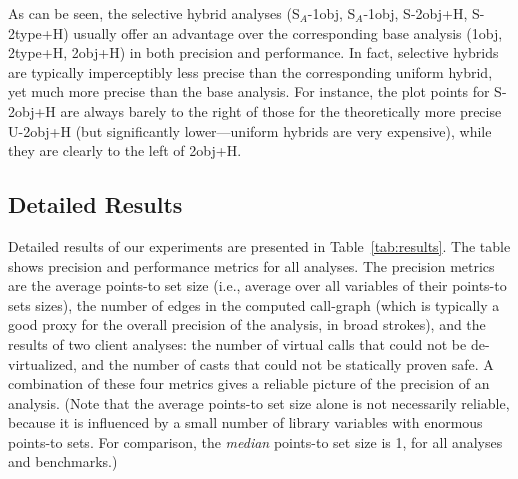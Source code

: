 As can be seen, the selective hybrid analyses (S$_A$-1obj, S$_A$-1obj,
S-2obj+H, S-2type+H) usually offer an advantage over the
corresponding base analysis (1obj, 2type+H, 2obj+H) in both precision
and performance. In fact, selective hybrids are typically
imperceptibly less precise than the corresponding uniform hybrid, yet
much more precise than the base analysis. For instance, the plot
points for S-2obj+H are always barely to the right of those for the
theoretically more precise U-2obj+H (but significantly lower---uniform
hybrids are very expensive), while they are clearly to the left of
2obj+H.


\subsection{Detailed Results}

Detailed results of our experiments are presented in
Table~\ref{tab:results}.  The table shows precision and performance
metrics for all analyses. The precision metrics are the average
points-to set size (i.e., average over all variables of their
points-to sets sizes), the number of edges in the computed call-graph
(which is typically a good proxy for the overall precision of the
analysis, in broad strokes), and the results of two client analyses:
the number of virtual calls that could not be de-virtualized, and the
number of casts that could not be statically proven safe. A
combination of these four metrics gives a reliable picture of the
precision of an analysis. (Note that the average points-to set size
alone is not necessarily reliable, because it is influenced by a small
number of library variables with enormous points-to sets.  For
comparison, the \emph{median} points-to set size is 1, for all
analyses and benchmarks.)

